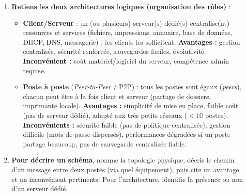 \documentclass[11pt]{article}
\begin{document}
\begin{methode}
\begin{enumerate}
\begin{itemize}
  \end{itemize}
  \item \textbf{Retiens les deux architectures logiques (organisation des rôles)} :
  \begin{itemize}
    \item \textbf{Client/Serveur} : un (ou plusieurs) serveur(s) dédié(s) centralise(nt) ressources et services (fichiers, impressions, annuaire, base de données, DHCP, DNS, messagerie) ; les clients les sollicitent. \textbf{Avantages :} gestion centralisée, sécurité renforcée, sauvegardes faciles, évolutivité. \textbf{Inconvénient :} coût matériel/logiciel du serveur, compétence admin requise.
    \item \textbf{Poste à poste} (\emph{Peer-to-Peer} / P2P) : tous les postes sont égaux (\emph{peers}), chacun peut être à la fois client et serveur (partage de dossiers, imprimante locale). \textbf{Avantages :} simplicité de mise en place, faible coût (pas de serveur dédié), adapté aux très petits réseaux ($< 10$ postes). \textbf{Inconvénients :} sécurité faible (pas de politique centralisée), gestion difficile (mots de passe dispersés), performances dégradées si un poste partage beaucoup, pas de sauvegarde centralisée fiable.
  \end{itemize}
  \item \textbf{Pour décrire un schéma}, nomme la topologie physique, décris le chemin d'un message entre deux postes (via quel équipement), puis cite un avantage et un inconvénient pertinents. Pour l'architecture, identifie la présence ou non d'un serveur dédié.
\end{enumerate}
\end{methode}
\end{document}
